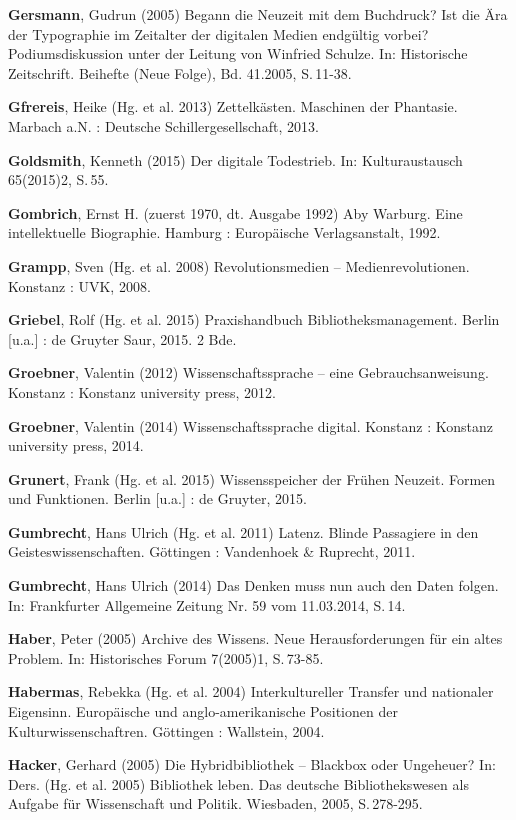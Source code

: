 \documentclass[a4paper,
fontsize=11pt,
oneside,
numbers=noperiodatend,
parskip=half-,
bibliography=totoc,
final
]{scrartcl}
\begin{document}
\textbf{Gersmann}, Gudrun (2005) Begann die Neuzeit mit dem Buchdruck?
Ist die Ära der Typographie im Zeitalter der digitalen Medien endgültig
vorbei? Podiumsdiskussion unter der Leitung von Winfried Schulze. In:
Historische Zeitschrift. Beihefte (Neue Folge), Bd. 41.2005, S.\,11-38.

\textbf{Gfrereis}, Heike (Hg. et al. 2013) Zettelkästen. Maschinen der
Phantasie. Marbach a.N. : Deutsche Schillergesellschaft, 2013.

\textbf{Goldsmith}, Kenneth (2015) Der digitale Todestrieb. In:
Kulturaustausch 65(2015)2, S.\,55.

\textbf{Gombrich}, Ernst H. (zuerst 1970, dt. Ausgabe 1992) Aby Warburg.
Eine intellektuelle Biographie. Hamburg : Europäische Verlagsanstalt,
1992.

\textbf{Grampp}, Sven (Hg. et al. 2008) Revolutionsmedien --
Medienrevolutionen. Konstanz : UVK, 2008.

\textbf{Griebel}, Rolf (Hg. et al. 2015) Praxishandbuch
Bibliotheksmanagement. Berlin {[}u.a.{]} : de Gruyter Saur, 2015. 2 Bde.

\textbf{Groebner}, Valentin (2012) Wissenschaftssprache -- eine
Gebrauchsanweisung. Konstanz : Konstanz university press, 2012.

\textbf{Groebner}, Valentin (2014) Wissenschaftssprache digital.
Konstanz : Konstanz university press, 2014.

\textbf{Grunert}, Frank (Hg. et al. 2015) Wissensspeicher der Frühen
Neuzeit. Formen und Funktionen. Berlin {[}u.a.{]} : de Gruyter, 2015.

\textbf{Gumbrecht}, Hans Ulrich (Hg. et al. 2011) Latenz. Blinde
Passagiere in den Geisteswissenschaften. Göttingen : Vandenhoek \&
Ruprecht, 2011.

\textbf{Gumbrecht}, Hans Ulrich (2014) Das Denken muss nun auch den
Daten folgen. In: Frankfurter Allgemeine Zeitung Nr. 59 vom 11.03.2014,
S.\,14.

\textbf{Haber}, Peter (2005) Archive des Wissens. Neue Herausforderungen
für ein altes Problem. In: Historisches Forum 7(2005)1, S.\,73-85.

\textbf{Habermas}, Rebekka (Hg. et al. 2004) Interkultureller Transfer
und nationaler Eigensinn. Europäische und anglo-amerikanische Positionen
der Kulturwissenschaftren. Göttingen : Wallstein, 2004.

\textbf{Hacker}, Gerhard (2005) Die Hybridbibliothek -- Blackbox oder
Ungeheuer? In: Ders. (Hg. et al. 2005) Bibliothek leben. Das deutsche
Bibliothekswesen als Aufgabe für Wissenschaft und Politik. Wiesbaden,
2005, S.\,278-295.
\end{document}

